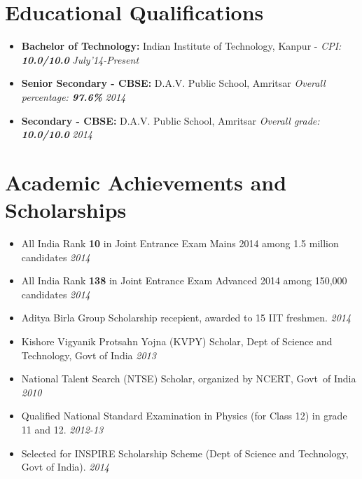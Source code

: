 \documentclass[11pt,a4paper]{moderncv}
\begin{document}
\maketitle
\vspace{-1cm}
\section*{Educational Qualifications}
\begin{itemize}
  \setlength\itemsep{0.2cm}
\item \textbf{\large{Bachelor of Technology:}} Indian Institute of Technology, Kanpur - \emph{CPI: \textbf{10.0/10.0}} \hfill\textit{July'14-Present}
\item \textbf{\large{Senior Secondary - CBSE:}} D.A.V. Public School, Amritsar \emph{Overall percentage: \textbf{97.6\%}} \hfill\textit{2014}
\item \textbf{\large{Secondary - CBSE:}} D.A.V. Public School, Amritsar \emph{Overall grade: \textbf{10.0/10.0}} \hfill\textit{2014}
\end{itemize}

\vspace{-0.1cm}
\section*{Academic Achievements and Scholarships}
\begin{itemize}
  \setlength\itemsep{0.5em}
  \item All India Rank \textbf{10} in Joint Entrance Exam Mains 2014 among 1.5 million candidates              \hfill \textit{2014}
  \item All India Rank \textbf{138} in Joint Entrance Exam Advanced 2014 among 150,000 candidates            	\hfill \textit{2014}
  \item Aditya Birla Group Scholarship recepient, awarded to 15 IIT freshmen.                        \hfill \textit{2014}
  \item Kishore Vigyanik Protsahn Yojna (KVPY) Scholar, Dept of Science and Technology, Govt of India
    \hfill \textit{2013}
  \item National Talent Search (NTSE) Scholar, organized by NCERT, Govt\ of India
    \hfill \textit{2010}
  \item Qualified National Standard Examination in Physics (for Class 12) in grade 11 and 12. \hfill \textit{2012-13}
  \item Selected for INSPIRE Scholarship Scheme (Dept of Science and Technology, Govt of India).
    \hfill \textit{2014}

\end{itemize}
\end{document}
